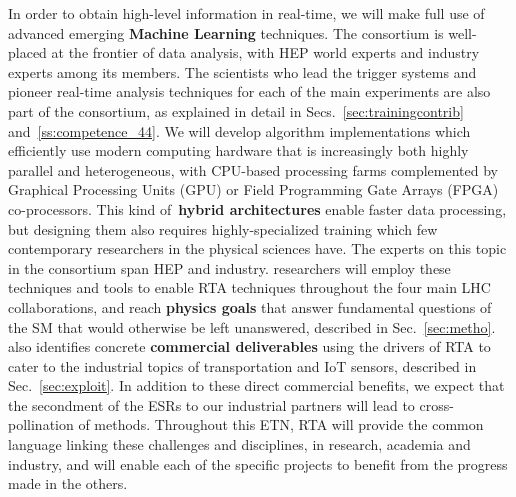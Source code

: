 In order to obtain high-level information in real-time, we will make 
full use of advanced emerging 
\textbf{Machine Learning} techniques. 
The consortium is well-placed at the frontier of data analysis,
with HEP world experts 
and industry experts
among its members. The scientists who lead the trigger systems and pioneer real-time
analysis techniques for each of
the main experiments 
are also part of the consortium, as explained in
detail in Secs.~\ref{sec:trainingcontrib} and~\ref{ss:competence_44}.
We will develop algorithm implementations which efficiently
use modern computing hardware that is increasingly both highly parallel and
heterogeneous, with CPU-based processing farms complemented by Graphical Processing
Units (GPU) or Field Programming Gate Arrays (FPGA) co-processors. 
This kind of~\textbf{hybrid architectures} enable
faster data processing, but designing them also requires highly-specialized
training which few contemporary researchers in the physical sciences have.
The experts on this topic in the consortium span HEP and industry.  
\acronym researchers will employ these techniques and tools to 
enable RTA techniques throughout the four main LHC collaborations,
and reach \textbf{physics goals} that answer fundamental questions of the SM that
would otherwise be left unanswered, described in Sec.~\ref{sec:metho}. 
\acronym also identifies concrete \textbf{commercial deliverables} using the
drivers of RTA to cater to the industrial topics of transportation
and IoT sensors, described in Sec.~\ref{sec:exploit}.
In addition to these direct commercial benefits, we expect that the secondment
of the ESRs to our industrial partners will lead to cross-pollination of
methods. Throughout this ETN, RTA
will provide the common language linking these challenges and disciplines, 
in research, academia and industry, and will enable each of the specific
projects to benefit from the progress made in the others.
\vskip2pt
